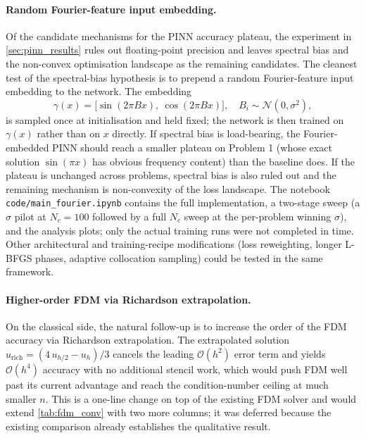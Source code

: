 \documentclass[11pt]{article}
\theoremstyle{plain}
\theoremstyle{remark}
\newcommand{\bigO}{\mathcal{O}}
\begin{document}
\paragraph{Random Fourier-feature input embedding.} Of the candidate
mechanisms for the PINN accuracy plateau, the experiment in
\cref{sec:pinn_results} rules out floating-point precision and leaves
spectral bias and the non-convex optimisation landscape as the
remaining candidates. The cleanest test of the spectral-bias hypothesis
is to prepend a random Fourier-feature input embedding
\citep{tancik2020,wang2021eigenvector} to the network. The embedding
\begin{equation*}
\gamma(x) = \bigl[ \sin(2 \pi B x),\ \cos(2 \pi B x) \bigr],
\quad B_i \sim \mathcal{N}(0, \sigma^2),
\end{equation*}
is sampled once at initialisation and held fixed; the network is then
trained on $\gamma(x)$ rather than on $x$ directly. If spectral bias is
load-bearing, the Fourier-embedded PINN should reach a smaller plateau
on Problem 1 (whose exact solution $\sin(\pi x)$ has obvious frequency
content) than the baseline does. If the plateau is unchanged across
problems, spectral bias is also ruled out and the remaining mechanism
is non-convexity of the loss landscape. The notebook
\texttt{code/main\_fourier.ipynb} contains the full implementation, a
two-stage sweep (a $\sigma$ pilot at $N_c = 100$ followed by a full
$N_c$ sweep at the per-problem winning $\sigma$), and the analysis
plots; only the actual training runs were not completed in time.
Other architectural and training-recipe modifications (loss reweighting,
longer L-BFGS phases, adaptive collocation sampling) could be tested in
the same framework.

\paragraph{Higher-order FDM via Richardson extrapolation.} On the
classical side, the natural follow-up is to increase the order of the
FDM accuracy via Richardson extrapolation. The extrapolated solution
$u_{\text{rich}} = (4\,u_{h/2} - u_h)/3$ cancels the leading $\bigO(h^2)$
error term and yields $\bigO(h^4)$ accuracy with no additional stencil
work, which would push FDM well past its current advantage and reach
the condition-number ceiling at much smaller $n$. This is a one-line
change on top of the existing FDM solver and would extend
\cref{tab:fdm_conv} with two more columns; it was deferred because the
existing comparison already establishes the qualitative result.
\end{document}
